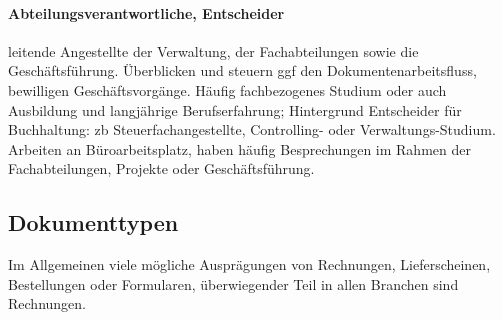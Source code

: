 \documentclass[11pt,oneside,a4paper,notitlepage]{article}
\begin{document}
%
\paragraph*{Abteilungsverantwortliche, Entscheider}
leitende Angestellte der Verwaltung, der Fachabteilungen sowie die Geschäftsführung. Überblicken und steuern ggf den Dokumentenarbeitsfluss, bewilligen Geschäftsvorgänge. Häufig fachbezogenes Studium oder auch Ausbildung und langjährige Berufserfahrung; Hintergrund Entscheider für Buchhaltung: zb Steuerfachangestellte, Controlling- oder Verwaltungs-Studium. Arbeiten an Büroarbeitsplatz, haben häufig Besprechungen im Rahmen der Fachabteilungen, Projekte oder Geschäftsführung.


\subsection{Dokumenttypen}
Im Allgemeinen viele mögliche Ausprägungen von Rechnungen, Lieferscheinen, Bestellungen oder Formularen, überwiegender Teil in allen Branchen sind Rechnungen.




%
\end{document}
